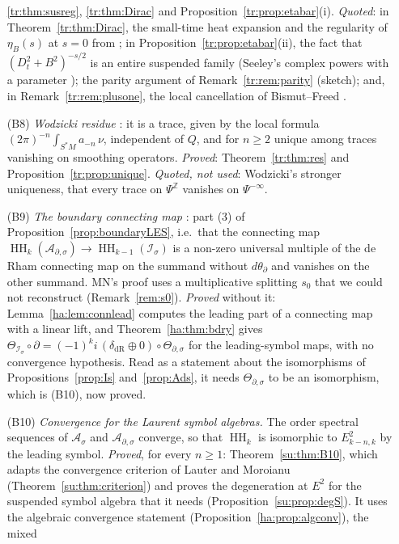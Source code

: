 \documentclass[11pt,oneside,reqno]{article}
\DeclareMathOperator{\HH}{HH}
\newcommand{\Z}{\mathbb Z}
\newcommand{\Is}{\mathcal I_\sigma}
\newcommand{\As}{\mathcal A_\sigma}
\newcommand{\Ads}{\mathcal A_{\partial,\sigma}}
\theoremstyle{plain}
\theoremstyle{definition}
\theoremstyle{remark}
\begin{document}
\begin{enumerate}
\ref{tr:thm:susreg}, \ref{tr:thm:Dirac} and
Proposition~\ref{tr:prop:etabar}(i). \emph{Quoted}: in
Theorem~\ref{tr:thm:Dirac}, the small-time heat expansion and the
regularity of \(\eta_B(s)\) at \(s=0\) from \cite{Notes}; in
Proposition~\ref{tr:prop:etabar}(ii), the fact that
\((D_t^2+B^2)^{-s/2}\) is an entire suspended family (Seeley's complex
powers with a parameter \cite{Seeley}); the parity argument of
Remark~\ref{tr:rem:parity} (sketch); and, in Remark~\ref{tr:rem:plusone},
the local cancellation of Bismut--Freed \cite{BismutFreed}.
\item[(B8)] \emph{Wodzicki residue} \cite{Wodzicki-residue,Guillemin-residue}:
it is a trace, given by the local formula
\((2\pi)^{-n}\int_{S^*M}a_{-n}\,\nu\), independent of \(Q\), and for
\(n\ge2\) unique among traces vanishing on smoothing operators.
\emph{Proved}: Theorem~\ref{tr:thm:res} and
Proposition~\ref{tr:prop:unique}. \emph{Quoted, not used}: Wodzicki's
stronger uniqueness, that every trace on \(\Psi^{\Z}\) vanishes on
\(\Psi^{-\infty}\).
\item[(B9)] \emph{The boundary connecting map} \cite[Prop.~5]{MN}: part
(3) of Proposition~\ref{prop:boundaryLES}, i.e.\ that the connecting map
\(\HH_k(\Ads)\to\HH_{k-1}(\Is)\) is a non-zero universal multiple of the
de Rham connecting map on the summand without \(d\theta_\partial\) and
vanishes on the other summand. MN's proof uses a multiplicative splitting
\(s_0\) that we could not reconstruct (Remark~\ref{rem:s0}).
\emph{Proved} without it: Lemma~\ref{ha:lem:connlead} computes the leading
part of a connecting map with a linear lift, and
Theorem~\ref{ha:thm:bdry} gives \(\Theta_{\Is}\circ\partial=(-1)^ki\,
(\delta_{\mathrm{dR}}\oplus0)\circ\Theta_{\partial,\sigma}\) for the
leading-symbol maps, with no convergence hypothesis. Read as a statement
about the isomorphisms of Propositions~\ref{prop:Is} and~\ref{prop:Ads},
it needs \(\Theta_{\partial,\sigma}\) to be an isomorphism, which is (B10),
now proved.
\item[(B10)] \emph{Convergence for the Laurent symbol algebras.} The order
spectral sequences of \(\As\) and \(\Ads\) converge, so that
\(\HH_k\) is isomorphic to \(E^2_{k-n,k}\) by the leading symbol.
\emph{Proved}, for every \(n\ge1\): Theorem~\ref{su:thm:B10}, which
adapts the convergence criterion of Lauter and Moroianu
\cite[Thm.~B.4]{LauterMoroianu} (Theorem~\ref{su:thm:criterion}) and
proves the degeneration at \(E^2\) for the suspended symbol algebra that
it needs (Proposition~\ref{su:prop:degS}). It uses the algebraic
convergence statement (Proposition~\ref{ha:prop:algconv}), the mixed

\end{enumerate}
\end{document}
